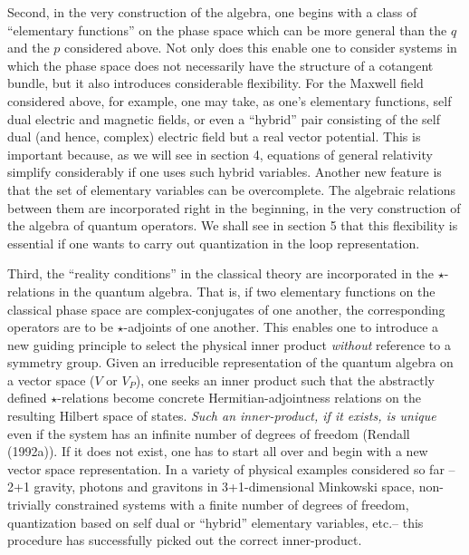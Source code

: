 Second, in the very construction of the algebra, one begins with a class
of ``elementary functions'' on the phase space which can be more general
than the $q$ and the $p$ considered above. Not only does this enable one to
consider systems in which the phase space does not necessarily have the
structure of a cotangent bundle, but it also introduces considerable
flexibility. For the Maxwell field considered above, for example, one may
take, as one's elementary functions, self dual electric and magnetic fields,
or even a ``hybrid'' pair consisting of the self dual (and hence, complex)
electric field but a real vector potential. This is important because,
as we will see in section 4, equations of general relativity simplify
considerably if one uses such hybrid variables. Another new feature
is that the set of elementary variables can be overcomplete. The algebraic
relations between them are incorporated right in the beginning, in the very
construction of the algebra of quantum operators. We shall see in section 5
that this flexibility is essential if one wants to carry out quantization in
the loop representation.

Third, the ``reality conditions'' in the classical theory are incorporated
in the $\star$-relations in the quantum algebra. That is, if two elementary
functions on the classical phase space are complex-conjugates of one another,
the corresponding operators are to be $\star$-adjoints of one another.
This enables one to introduce a new guiding principle to select the physical
inner product {\it without} reference to a symmetry group. Given an
irreducible representation of the quantum algebra on a vector space
($V$ or $V_P$), one seeks an inner product such that the abstractly defined
$\star$-relations become concrete Hermitian-adjointness relations on the
resulting Hilbert space of states. {\it Such an inner-product, if it exists,
is unique} even if the system has an infinite number of degrees of freedom
(Rendall (1992a)). If it does not exist, one has to start all over and begin
with a new vector space representation. In a variety of physical examples
considered so far -- 2+1 gravity, photons and gravitons in 3+1-dimensional
Minkowski space, non-trivially constrained systems with a finite number of
degrees of freedom, quantization based on self dual or ``hybrid'' elementary
variables, etc.-- this procedure has successfully picked out the correct
inner-product.

